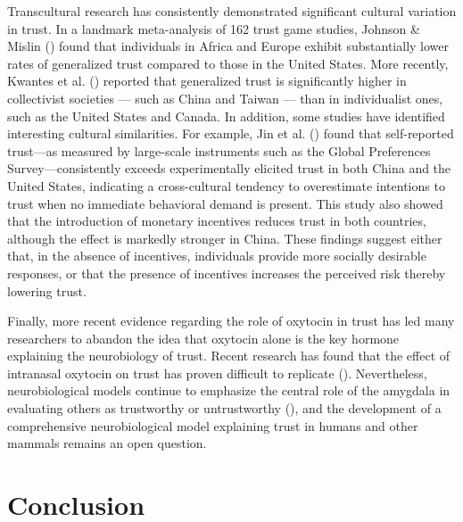 \documentclass[
  letterpaper,
]{book}
\begin{document}
Transcultural research has consistently demonstrated significant
cultural variation in trust. In a landmark meta-analysis of 162 trust
game studies, Johnson \& Mislin
() found that individuals in
Africa and Europe exhibit substantially lower rates of generalized trust
compared to those in the United States. More recently, Kwantes et al.
() reported that generalized
trust is significantly higher in collectivist societies --- such as
China and Taiwan --- than in individualist ones, such as the United
States and Canada. In addition, some studies have identified interesting
cultural similarities. For example, Jin et al.
() found that self-reported
trust---as measured by large-scale instruments such as the Global
Preferences Survey---consistently exceeds experimentally elicited trust
in both China and the United States, indicating a cross-cultural
tendency to overestimate intentions to trust when no immediate
behavioral demand is present. This study also showed that the
introduction of monetary incentives reduces trust in both countries,
although the effect is markedly stronger in China. These findings
suggest either that, in the absence of incentives, individuals provide
more socially desirable responses, or that the presence of incentives
increases the perceived risk thereby lowering trust.

Finally, more recent evidence regarding the role of oxytocin in trust
has led many researchers to abandon the idea that oxytocin alone is the
key hormone explaining the neurobiology of trust. Recent research has
found that the effect of intranasal oxytocin on trust has proven
difficult to replicate (). Nevertheless, neurobiological models continue to emphasize the
central role of the amygdala in evaluating others as trustworthy or
untrustworthy (), and the development of a comprehensive neurobiological model
explaining trust in humans and other mammals remains an open question.

\section{Conclusion}\label{conclusion-11}
\end{document}
